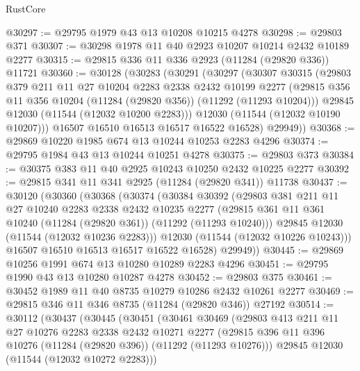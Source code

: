 \begin{lexlean}{RustCore}
\begin{coremodule}
@30297 := @29795 @1979 @43 @13 @10208 @10215 @4278
@30298 := @29803 @371
@30307 := @30298 @1978 @11 @40 @2923 @10207 @10214 @2432 @10189 @2277
@30315 := @29815 @336 @11 @336 @2923 (@11284 (@29820 @336)) @11721
@30360 := @30128
    (@30283
      (@30291
        (@30297
          (@30307
            @30315
            (@29803
              @379
              @211
              @11
              @27
              @10204
              @2283
              @2338
              @2432
              @10199
              @2277
              (@29815 @356 @11 @356 @10204 (@11284 (@29820 @356)) (@11292 (@11293 @10204)))
              @29845
              @12030
              (@11544 (@12032 @10200 @2283)))
            @12030
            (@11544 (@12032 @10190 @10207)))
          @16507
          @16510
          @16513
          @16517
          @16522
          @16528)
        @29949))
@30368 := @29869 @10220 @1985 @674 @13 @10244 @10253 @2283 @4296
@30374 := @29795 @1984 @43 @13 @10244 @10251 @4278
@30375 := @29803 @373
@30384 := @30375 @383 @11 @40 @2925 @10243 @10250 @2432 @10225 @2277
@30392 := @29815 @341 @11 @341 @2925 (@11284 (@29820 @341)) @11738
@30437 := @30120
    (@30360
      (@30368
        (@30374
          (@30384
            @30392
            (@29803
              @381
              @211
              @11
              @27
              @10240
              @2283
              @2338
              @2432
              @10235
              @2277
              (@29815 @361 @11 @361 @10240 (@11284 (@29820 @361)) (@11292 (@11293 @10240)))
              @29845
              @12030
              (@11544 (@12032 @10236 @2283)))
            @12030
            (@11544 (@12032 @10226 @10243)))
          @16507
          @16510
          @16513
          @16517
          @16522
          @16528)
        @29949))
@30445 := @29869 @10256 @1991 @674 @13 @10280 @10289 @2283 @4296
@30451 := @29795 @1990 @43 @13 @10280 @10287 @4278
@30452 := @29803 @375
@30461 := @30452 @1989 @11 @40 @8735 @10279 @10286 @2432 @10261 @2277
@30469 := @29815 @346 @11 @346 @8735 (@11284 (@29820 @346)) @27192
@30514 := @30112
    (@30437
      (@30445
        (@30451
          (@30461
            @30469
            (@29803
              @413
              @211
              @11
              @27
              @10276
              @2283
              @2338
              @2432
              @10271
              @2277
              (@29815 @396 @11 @396 @10276 (@11284 (@29820 @396)) (@11292 (@11293 @10276)))
              @29845
              @12030
              (@11544 (@12032 @10272 @2283)))

\end{coremodule}
\end{lexlean}
